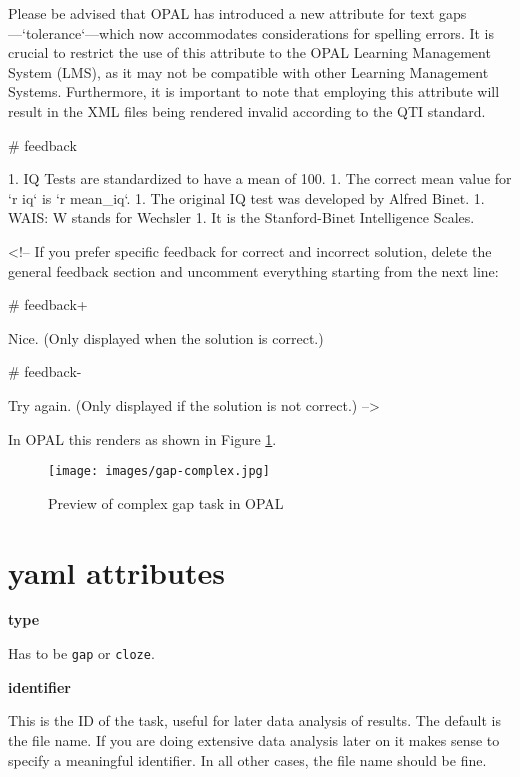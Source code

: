 \documentclass[twoside]{tufte-book}
\newenvironment{Shaded}{}{}
\begin{document}
\begin{Shaded}
\begin{Highlighting}
Please be advised that OPAL has introduced a new attribute for text
gaps—`tolerance`—which now accommodates considerations for spelling errors. It
is crucial to restrict the use of this attribute to the OPAL Learning Management
System (LMS), as it may not be compatible with other Learning Management
Systems. Furthermore, it is important to note that employing this attribute will
result in the XML files being rendered invalid according to the QTI standard.

# feedback

1. IQ Tests are standardized to have a mean of 100.
1. The correct mean value for `r iq` is `r mean_iq`.
1. The original IQ test was developed by Alfred Binet.
1. WAIS: W stands for Wechsler
1. It is the Stanford-Binet Intelligence Scales.

<!-- If you prefer specific feedback for correct and incorrect solution, delete
the general feedback section and uncomment everything starting from the next
line:

# feedback+

Nice. (Only displayed when the solution is correct.)

# feedback-

Try again. (Only displayed if the solution is not correct.)
-->
\end{Highlighting}
\end{Shaded}

In OPAL this renders as shown in Figure \ref{gap2opal}.

\begin{figure}
\centering
\texttt{[image: images/gap-complex.jpg]}
\caption{\label{gap2opal}Preview of complex gap task in OPAL}
\end{figure}

\section{yaml attributes}\label{yaml-attributes-2}

\noindent\textbf{type}\label{type-2}

Has to be \texttt{gap} or \texttt{cloze}.

\noindent\textbf{identifier}\label{identifier-2}

This is the ID of the task, useful for later data analysis of results. The default is the file name. If you are doing extensive data analysis later on it makes sense to
specify a meaningful identifier. In all other cases, the file name should be
fine.
\end{document}
